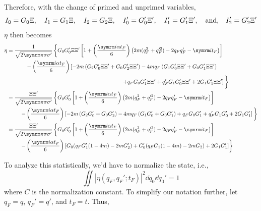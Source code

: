 Therefore, with the change of primed and unprimed variables,
\begin{equation}
    I_0 = G_0\Xi, \quad I_1 = G_1\Xi, \quad I_2 = G_2\Xi, \quad
    I_0' = G_0'\Xi', \quad I_1' = G_1'\Xi', \quad\textrm{and,}\quad I_2' = G_2'\Xi'
\end{equation}
$\eta$ then becomes
\begin{align}
    \eta &= \begin{multlined}[t]
        \frac{1}{\sqrt{2\cpi\sigma\sigma'}}\left\{ G_0G_0'\Xi\Xi'\left[1 + \left(\frac{\im\alpha t_F}{6}\right)\left(2m(q_F^2 + q_F'^2) - 2q_Fq_F' - \im t_F\right)\right] \right.\\
        - \left(\frac{\im\alpha t_F}{6}\right) \left[-2m\left(G_2G_0'\Xi\Xi' + G_0G_2'\Xi\Xi'\right) - 4mq_F\left(G_1G_0'\Xi\Xi' + G_0G_1'\Xi\Xi'\right) \right. \\ \left.\left.
        + q_FG_0G_1'\Xi\Xi' + q_F'G_1G_0'\Xi\Xi' + 2G_1G_1'\Xi\Xi'\right] \vphantom{\frac{1}{2\cpi\sqrt{\sigma\sigma'}}}\right\}
    \end{multlined} \\
    &= \begin{multlined}[t]
        \frac{\Xi\Xi'}{\sqrt{2\cpi\sigma\sigma'}}\left\{ G_0G_0'\left[1 + \left(\frac{\im\alpha t_F}{6}\right)\left(2m(q_F^2 + q_F'^2) - 2q_Fq_F' - \im t_F\right)\right] \right.\\ \left.
        - \left(\frac{\im\alpha t_F}{6}\right) \left[-2m\left(G_2G_0' + G_0G_2'\right) - 4mq_F\left(G_1G_0' + G_0G_1'\right)
        + q_FG_0G_1' + q_F'G_1G_0' + 2G_1G_1'\right] \vphantom{\frac{1}{2\cpi\sqrt{\sigma\sigma'}}}\right\}
    \end{multlined} \nonumber\\
    &= \begin{multlined}[t]
        \frac{\Xi\Xi'}{\sqrt{2\cpi\sigma\sigma'}} \left\{ G_0G_0'\left[1 + \left(\frac{\im\alpha t_F}{6}\right) \left( 2m(q_F^2 + q_F'^2) - 2q_Fq_F' - \im t_F\right)\right] \right. \\ \left.
        - \left(\frac{\im\alpha t_F}{6}\right) \left[G_0(q_FG_1'(1 - 4m) - 2mG_2') + G_0'(q_FG_1(1 - 4m) - 2mG_2) + 2G_1G_1'\right] \right\}
    \end{multlined}
\end{align}

To analyze this statistically, we'd have to normalize the state, i.e.,
\begin{equation}
    \iint|\eta(q_F, q_F'; t_F)|^2\dd{q_0}\dd{q_0'} = 1 \label{eq:spring_jpd_normalization_condition}
\end{equation}
where $C$ is the normalization constant. To simplify our notation further, let $q_F = q$, $q_F' = q'$, and $t_F = t$. Thus,

